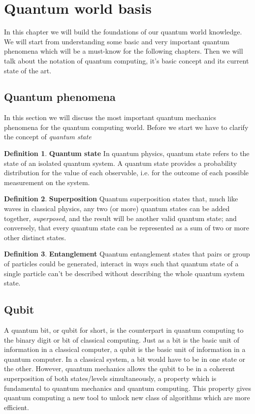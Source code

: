 \documentclass[main.tex]{subfiles}
\theoremstyle{definition}
\newtheorem{definition}{Definition}[section]
\begin{document}
\section{Quantum world basis}
In this chapter we will build the foundations of our quantum world knowledge.
We will start from understanding some basic and very important quantum phenomena which will be 
a must-know for the following chapters. Then we will talk about the notation of quantum computing, it's 
basic concept and its current state of the art.
	\subsection{Quantum phenomena}
	In this section we will discuss the most important quantum mechanics phenomena for the quantum computing world.
	Before we start we have to clarify the concept of \textit{quantum state}
	
	\theoremstyle{definition}
	\begin{definition}{\textbf{Quantum state}}
	In quantum physics, quantum state refers to the state of an isolated quantum system. A quantum state provides a probability 
	distribution for the value of each observable, i.e. for the outcome of each possible measurement on the system.
	\end{definition}
	
	\theoremstyle{definition}
	\begin{definition}{\textbf{Superposition}}
	Quantum superposition states that, much like waves in classical physics, 
	any two (or more) quantum states can be added together, \textit{superposed}, and the result will be another valid quantum state; 
	and conversely, that every quantum state can be represented as a sum of two or more other distinct states.
	\end{definition}
	
	\theoremstyle{definition}
	\begin{definition}{\textbf{Entanglement}}
	Quantum entanglement states that pairs or group of particles could be generated, interact in ways such that quantum state of a 
	single particle can't be described without describing the whole quantum system state.
	\end{definition}
		
	\subsection{Qubit}
	A quantum bit, or qubit for short, is the counterpart in quantum computing to the binary digit or bit of classical computing. 
	Just as a bit is the basic unit of information in a classical computer, a qubit is the basic unit of information 
	in a quantum computer. In a classical system, a bit would have to be in one state or the other. However, quantum mechanics allows
	the qubit to be in a coherent superposition of both states/levels simultaneously, a property which is fundamental to quantum
	mechanics and quantum computing. This property gives quantum computing a new tool to unlock new class of algorithms which are 
	more efficient.
	
\end{document}
